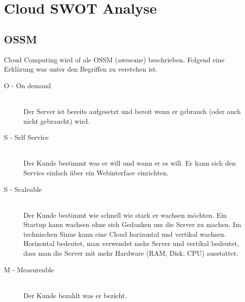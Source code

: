

\newcommand{\SUBJECT}{Report}
\newcommand{\TITLE}{Cloud Infrastructre Lab 5}



\section{Cloud SWOT Analyse}

\subsection{OSSM}
Cloud Computing wird of ale OSSM (awesome) beschrieben. Folgend eine Erklärung was unter den Begriffen zu verstehen ist.
\begin{description}
	\item[O - On demand ] \hfill \\
	Der Server ist bereits aufgesetzt und bereit wenn er gebrauch (oder auch nicht gebraucht) wird.
	\item[S - Self Service] \hfill \\
	Der Kunde bestimmt was er will und wann er es will. Er kann sich den Service einfach über ein Webinterface einrichten.
	\item[S - Scaleable] \hfill \\
	Der Kunde bestimmt wie schnell wie stark er wachsen möchten. Ein Startup kann wachsen ohne sich Gedanken um die Server zu machen. Im technischen Sinne kann eine Cloud horizontal und vertikal wachsen. Horizontal bedeutet, man verwendet mehr Server und vertikal bedeutet, dass man die Server mit mehr Hardware (RAM, Disk, CPU) ausstattet.
	\item[M - Measureable] \hfill \\
	Der Kunde bezahlt was er bezieht. 
\end{description}

